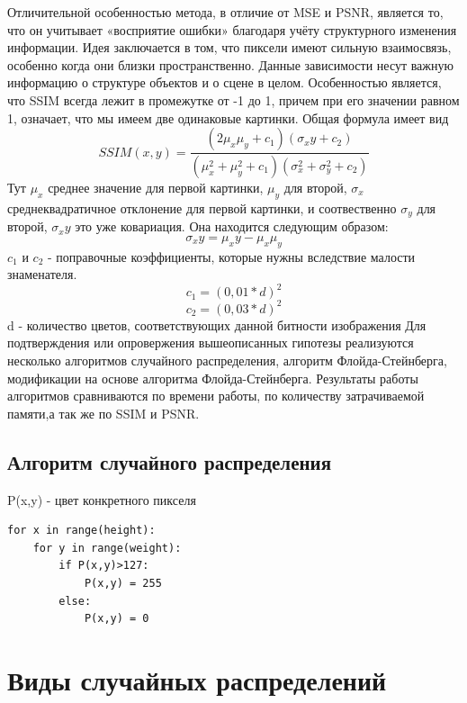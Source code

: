 Отличительной особенностью метода, в отличие от MSE и PSNR, является то, что он учитывает «восприятие ошибки» благодаря учёту структурного изменения информации. Идея заключается в том, что пиксели имеют сильную взаимосвязь, особенно когда они близки пространственно. Данные зависимости несут важную информацию о структуре объектов и о сцене в целом.
Особенностью является, что SSIM всегда лежит в промежутке от -1 до 1, причем при его значении равном 1, означает, что мы имеем две одинаковые картинки. Общая формула имеет вид
\begin{equation}
SSIM(x,y) = \frac{(2\mu_x\mu_y +c_1)(\sigma_xy+c_2)}{(\mu^2_x+\mu^2_y+c_1)(\sigma^2_x+\sigma^2_y+c_2)}
\label{F:F3}
\end{equation}
Тут $\mu_x$ среднее значение для первой картинки, $\mu_y$  для второй, $\sigma_x$ среднеквадратичное отклонение для первой картинки, и соотвественно $\sigma_y$ для второй, $\sigma_xy$ это уже ковариация. Она находится следующим образом:
\begin{equation}
\sigma_xy = \mu_xy - \mu_x\mu_y
\label{F:F4}
\end{equation} 
$c_1$ и $c_2$ -  поправочные коэффициенты, которые нужны вследствие малости знаменателя.
\begin{equation}
c_1= (0,01*d)^2 
\label{F:F5} 
\end{equation}
\begin{equation}
c_2=(0,03*d)^2
\label{F:F6}
\end{equation}  
d - количество цветов, соответствующих данной битности изображения 
Для подтверждения или опровержения вышеописанных гипотезы реализуются несколько алгоритмов случайного распределения, алгоритм Флойда-Стейнберга, модификации на основе алгоритма Флойда-Стейнберга. Результаты работы алгоритмов сравниваются по времени работы, по количеству затрачиваемой памяти,а так же по SSIM и PSNR.
\subsection{Алгоритм случайного распределения} 
P(x,y)  - цвет конкретного пикселя
\begin{lstlisting}[style=pseudocode,caption={Алгоритм случайного распределения}] 
for x in range(height):
    for y in range(weight):
        if P(x,y)>127:
            P(x,y) = 255
        else:
            P(x,y) = 0
\end{lstlisting}

\section{Виды случайных распределений} 
